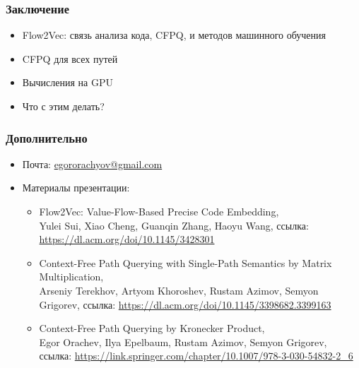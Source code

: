 \documentclass[xcolor=table,english]{beamer}
\begin{document}
\begin{frame}[fragile] \frametitle{Заключение}
    \begin{itemize}
        \item Flow2Vec: связь анализа кода, CFPQ, и методов машинного обучения
        \item CFPQ для всех путей
        \item Вычисления на GPU
        \item Что с этим делать?
    \end{itemize}
\end{frame}

\begin{frame} \frametitle{Дополнительно}
    \begin{itemize}
        \item Почта: \href{mailto:egororachyov@gmail.com}{egororachyov@gmail.com}
        \item Материалы презентации:
        {
            \begin{itemize}
                \item Flow2Vec: Value-Flow-Based Precise Code Embedding, \\Yulei Sui, Xiao Cheng, Guanqin Zhang, Haoyu Wang, ссылка: \href{https://dl.acm.org/doi/10.1145/3428301}{https://dl.acm.org/doi/10.1145/3428301}
                \item Context-Free Path Querying with Single-Path Semantics by Matrix Multiplication, \\Arseniy Terekhov, Artyom  Khoroshev, Rustam  Azimov, Semyon Grigorev, ссылка: \href{https://dl.acm.org/doi/10.1145/3398682.3399163}{https://dl.acm.org/doi/10.1145/3398682.3399163}
                \item Context-Free Path Querying by Kronecker Product, \\Egor Orachev, Ilya Epelbaum, Rustam  Azimov, Semyon Grigorev, ссылка: \href{https://link.springer.com/chapter/10.1007/978-3-030-54832-2\_6}{https://link.springer.com/chapter/10.1007/978-3-030-54832-2\_6}
            \end{itemize}
        }
    \end{itemize}
\end{frame}
\end{document}
